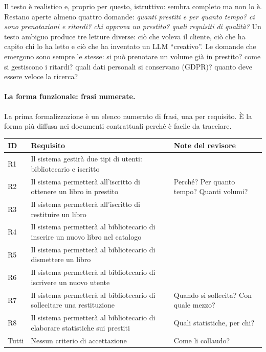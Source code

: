 \documentclass[12pt]{extarticle}
\begin{document}
\noindent Il testo è realistico e, proprio per questo, istruttivo: sembra completo ma non lo è. Restano aperte almeno quattro domande: \textit{quanti prestiti e per quanto tempo? ci sono prenotazioni e ritardi? chi approva un prestito? quali requisiti di qualità?} Un testo ambiguo produce tre letture diverse: ciò che voleva il cliente, ciò che ha capito chi lo ha letto e ciò che ha inventato un LLM ``creativo''. Le domande che emergono sono sempre le stesse: si può prenotare un volume già in prestito? come si gestiscono i ritardi? quali dati personali si conservano (GDPR)? quanto deve essere veloce la ricerca?

\paragraph{La forma funzionale: frasi numerate.}
La prima formalizzazione è un elenco numerato di frasi, una per requisito. È la forma più diffusa nei documenti contrattuali perché è facile da tracciare.

\begin{center}
\small
\begin{tabular}{p{0.9cm}p{9.6cm}p{4.7cm}}
    \toprule
    \textbf{ID} & \textbf{Requisito} & \textbf{Note del revisore} \\
    \midrule
    R1 & Il sistema gestirà due tipi di utenti: bibliotecario e iscritto & \\
    R2 & Il sistema permetterà all'iscritto di ottenere un libro in prestito & Perché? Per quanto tempo? Quanti volumi? \\
    R3 & Il sistema permetterà all'iscritto di restituire un libro & \\
    R4 & Il sistema permetterà al bibliotecario di inserire un nuovo libro nel catalogo & \\
    R5 & Il sistema permetterà al bibliotecario di dismettere un libro & \\
    R6 & Il sistema permetterà al bibliotecario di iscrivere un nuovo utente & \\
    R7 & Il sistema permetterà al bibliotecario di sollecitare una restituzione & Quando si sollecita? Con quale mezzo? \\
    R8 & Il sistema permetterà al bibliotecario di elaborare statistiche sui prestiti & Quali statistiche, per chi? \\
    \midrule
    Tutti & Nessun criterio di accettazione & Come li collaudo? \\
    \bottomrule
\end{tabular}
\end{center}
\end{document}

